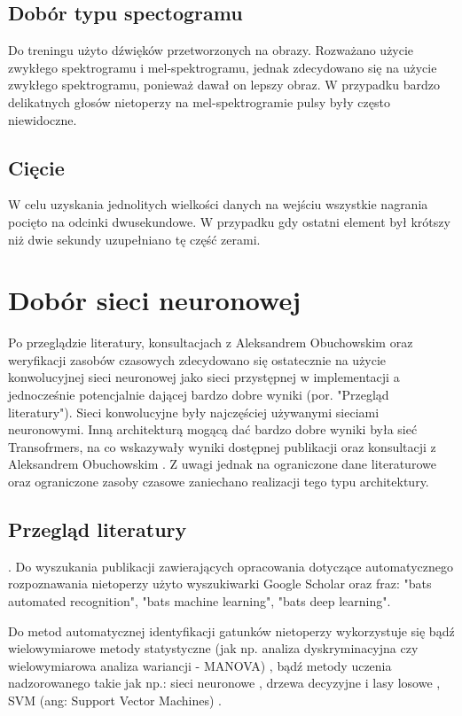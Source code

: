 \documentclass{sprz}
\begin{document}
\subsection{Dobór typu spectogramu}
Do treningu użyto dźwięków przetworzonych na obrazy. Rozważano użycie zwykłego spektrogramu i mel-spektrogramu, jednak zdecydowano się na użycie zwykłego spektrogramu, ponieważ dawał on lepszy obraz. W przypadku bardzo delikatnych głosów nietoperzy na mel-spektrogramie pulsy były często niewidoczne.

\subsection{Cięcie}
W celu uzyskania jednolitych wielkości danych na wejściu wszystkie nagrania pocięto na odcinki dwusekundowe. W przypadku gdy ostatni element był krótszy niż dwie sekundy uzupełniano tę część zerami.

\section{Dobór sieci neuronowej}
Po przeglądzie literatury, konsultacjach z Aleksandrem Obuchowskim oraz weryfikacji zasobów czasowych zdecydowano się ostatecznie na użycie konwolucyjnej sieci neuronowej jako sieci przystępnej w implementacji a jednocześnie potencjalnie dającej bardzo dobre wyniki (por. "Przegląd literatury"). Sieci konwolucyjne były najczęściej używanymi sieciami neuronowymi. Inną architekturą mogącą dać bardzo dobre wyniki była sieć Transofrmers, na co wskazywały wyniki dostępnej publikacji oraz konsultacji z Aleksandrem Obuchowskim \cite{bats-transformers}. Z uwagi jednak na ograniczone dane literaturowe oraz ograniczone zasoby czasowe zaniechano realizacji tego typu architektury.

\subsection{Przegląd literatury}.
Do wyszukania publikacji zawierających opracowania dotyczące automatycznego rozpoznawania nietoperzy użyto wyszukiwarki Google Scholar oraz fraz: "bats automated recognition", "bats machine learning", "bats deep learning".

Do metod automatycznej identyfikacji gatunków nietoperzy wykorzystuje się
bądź wielowymiarowe metody statystyczne (jak np. analiza dyskryminacyjna czy wielowymiarowa analiza wariancji - MANOVA) \cite{bats-id-statistics}, bądź metody uczenia nadzorowanego \cite{bats-id-supervised} takie jak np.: sieci neuronowe \cite{bats-id-nn}, drzewa decyzyjne i lasy losowe \cite{bats-random-forest}, SVM (ang: Support Vector Machines) \cite{bats-id-svm}.
\end{document}
